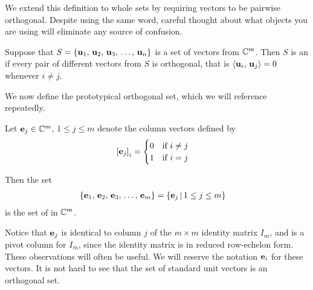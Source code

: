 \documentclass{ximera}
\begin{document}
We extend this definition to whole sets by requiring vectors to be
pairwise orthogonal.  Despite using the same word, careful thought
about what objects you are using will eliminate any source of
confusion.

\begin{definition}

  Suppose that $S=\left\{\mathbf{u}_{1},\,\mathbf{u}_{2},\,\mathbf{u}_{3},\,\ldots,\,\mathbf{u}_{n}\right\}$ is a set of vectors from
  $\mathbb{C}^{m}$.  Then $S$ is an  if every pair of
  different vectors from $S$ is orthogonal, that is
  $\left\langle\mathbf{u}_i,\,\mathbf{u}_j\right\rangle=0$ whenever $i\neq j$.

\end{definition}

We now define the prototypical orthogonal set, which we will reference
repeatedly.

\begin{definition}

  Let $\mathbf{e}_j\in\mathbb{C}^{m}$, $1\leq j\leq m$ denote the column
  vectors defined by
  \begin{align*}
    \left\lbrack\mathbf{e}_j\right\rbrack_{i}
    &=
      \begin{cases}
        0&\text{if $i\neq j$}\\
        1&\text{if $i=j$}
      \end{cases}
  \end{align*}

  Then the set
  \begin{align*}
    \left\{\mathbf{e}_{1},\,\mathbf{e}_{2},\,\mathbf{e}_{3},\,\ldots,\,\mathbf{e}_{m}\right\}&=\left\lbrace\mathbf{e}_j\,\middle|\,1\leq j\leq m\right\rbrace
  \end{align*}
  is the set of  in $\mathbb{C}^{m}$.
  
\end{definition}

Notice that $\mathbf{e}_j$ is identical to column $j$ of the $m\times m$
identity matrix $I_m$, and is a pivot column for $I_m$, since the
identity matrix is in reduced row-echelon form.  These observations
will often be useful.  We will reserve the notation $\mathbf{e}_i$ for
these vectors.  It is not hard to see that the set of standard unit
vectors is an orthogonal set.
\end{document}
